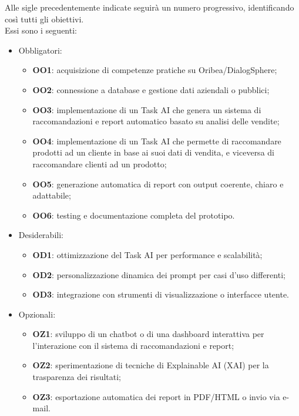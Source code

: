 Alle sigle precedentemente indicate seguirà un numero progressivo, identificando così
tutti gli obiettivi.\\
Essi sono i seguenti:
\begin{itemize}
    \item Obbligatori:
    \begin{itemize}
        \item \textbf{OO1}: acquisizione di competenze pratiche su Oribea/DialogSphere;
        \item \textbf{OO2}: connessione a database e gestione dati aziendali o pubblici;
        \item \textbf{OO3}: implementazione di un Task AI che genera un sistema di raccomandazioni e report automatico basato su analisi delle vendite;
        \item \textbf{OO4}: implementazione di un Task AI che permette di raccomandare prodotti ad un cliente in base ai suoi dati di vendita, e viceversa di raccomandare clienti ad un prodotto;
        \item \textbf{OO5}: generazione automatica di report con output coerente, chiaro e adattabile;
        \item \textbf{OO6}: testing e documentazione completa del prototipo.
    \end{itemize}
    \item Desiderabili:
    \begin{itemize}
        \item \textbf{OD1}: ottimizzazione del Task AI per performance e scalabilità;
        \item \textbf{OD2}: personalizzazione dinamica dei prompt per casi d’uso differenti;
        \item \textbf{OD3}: integrazione con strumenti di visualizzazione o interfacce utente.
    \end{itemize}
    \item Opzionali:
    \begin{itemize}
        \item \textbf{OZ1}: sviluppo di un chatbot o di una dashboard interattiva per l'interazione con il sistema di raccomandazioni e report;
        \item \textbf{OZ2}: sperimentazione di tecniche di Explainable AI (XAI) per la trasparenza dei risultati;
        \item \textbf{OZ3}: esportazione automatica dei report in PDF/HTML o invio via e-mail.
    \end{itemize}
\end{itemize}


